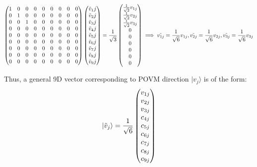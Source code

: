 \documentclass{article}
\begin{document}
\[
\begin{pmatrix}
1 & 0 & 0 & 0 & 0 & 0 & 0 & 0 & 0 \\
0 & 1 & 0 & 0 & 0 & 0 & 0 & 0 & 0 \\
0 & 0 & 1 & 0 & 0 & 0 & 0 & 0 & 0 \\
0 & 0 & 0 & 0 & 0 & 0 & 0 & 0 & 0 \\
0 & 0 & 0 & 0 & 0 & 0 & 0 & 0 & 0 \\
0 & 0 & 0 & 0 & 0 & 0 & 0 & 0 & 0 \\
0 & 0 & 0 & 0 & 0 & 0 & 0 & 0 & 0 \\
0 & 0 & 0 & 0 & 0 & 0 & 0 & 0 & 0 \\
0 & 0 & 0 & 0 & 0 & 0 & 0 & 0 & 0
\end{pmatrix}  
\begin{pmatrix}
\tilde{v}_1j \\
\tilde{v}_2j \\
\tilde{v}_3j \\
\tilde{v}_4j \\
\tilde{v}_5j \\
\tilde{v}_6j \\
\tilde{v}_7j \\
\tilde{v}_8j \\
\tilde{v}_9j
\end{pmatrix}  =  \frac{1}{\sqrt{3}} \begin{pmatrix}
 \frac{1}{\sqrt{2}} v_{1j} \\
 \frac{1}{\sqrt{2}} v_{2j} \\
 \frac{1}{\sqrt{2}}v_{3j} \\
0 \\
0 \\
0 \\
0 \\
0 \\
0
\end{pmatrix} 
\implies \Tilde{v_{1j}} = \frac{1}{\sqrt{6}} v_{1j}, \Tilde{v_{2j}} = \frac{1}{\sqrt{6}} v_{2j}, \Tilde{v_{3j}} = \frac{1}{\sqrt{6}} v_{3j}
\]

Thus, a general 9D vector corresponding to POVM direction $|v_j\rangle$ is of the form:
\begin{equation}
    
|\Tilde{v}_{j}\rangle = \frac{1}{\sqrt{6}} \begin{pmatrix}
v_{1j} \\
v_{2j} \\
v_{3j} \\
c_{4j} \\
c_{5j} \\
c_{6j} \\
c_{7j} \\
c_{8j} \\
c_{9j}
\end{pmatrix}
\end{equation}
\end{document}
